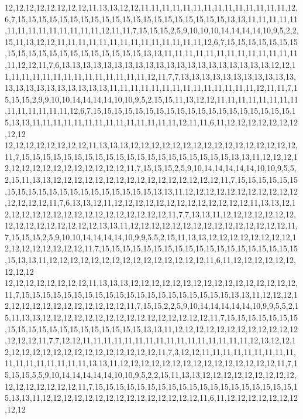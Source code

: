 12,12,12,12,12,12,12,12,11,13,13,12,12,11,11,11,11,11,11,11,11,11,11,11,11,11,11,12,6,7,15,15,15,15,15,15,15,15,15,15,15,15,15,15,15,15,15,15,15,15,13,13,11,11,11,11,11,11,11,11,11,11,11,11,11,11,12,11,11,7,15,15,15,2,5,9,10,10,10,14,14,14,14,10,9,5,2,2,15,11,13,12,12,11,11,11,11,11,11,11,11,11,11,11,11,11,11,12,6,7,15,15,15,15,15,15,15,15,15,15,15,15,15,15,15,15,15,15,15,15,13,13,11,11,11,11,11,11,11,11,11,11,11,11,11,11,12,12,11,7,6,13,13,13,13,13,13,13,13,13,13,13,13,13,13,13,13,13,13,13,13,12,12,11,11,11,11,11,11,11,11,11,11,11,11,11,11,12,11,7,7,13,13,13,13,13,13,13,13,13,13,13,13,13,13,13,13,13,13,13,13,13,11,11,11,11,11,11,11,11,11,11,11,11,11,11,12,11,11,7,15,15,15,2,9,9,10,10,14,14,14,14,10,10,9,5,2,15,15,11,13,12,12,11,11,11,11,11,11,11,11,11,11,11,11,11,11,12,6,7,15,15,15,15,15,15,15,15,15,15,15,15,15,15,15,15,15,15,15,15,13,13,11,11,11,11,11,11,11,11,11,11,11,11,11,11,12,11,11,6,11,12,12,12,12,12,12,12,12,12
12,12,12,12,12,12,12,12,11,13,13,13,12,12,12,12,12,12,12,12,12,12,12,12,12,12,12,12,11,7,15,15,15,15,15,15,15,15,15,15,15,15,15,15,15,15,15,15,15,15,13,13,11,12,12,12,12,12,12,12,12,12,12,12,12,12,12,12,11,7,15,15,15,2,5,9,10,14,14,14,14,14,10,10,9,5,5,2,15,11,13,13,12,12,12,12,12,12,12,12,12,12,12,12,12,12,12,12,11,7,15,15,15,15,15,15,15,15,15,15,15,15,15,15,15,15,15,15,15,15,13,13,11,12,12,12,12,12,12,12,12,12,12,12,12,12,12,12,11,7,6,13,13,12,11,12,12,12,12,12,12,12,12,12,12,12,12,12,11,13,13,12,12,12,12,12,12,12,12,12,12,12,12,12,12,12,12,12,11,7,7,13,13,11,12,12,12,12,12,12,12,12,12,12,12,12,12,12,12,12,13,13,11,12,12,12,12,12,12,12,12,12,12,12,12,12,12,12,11,7,15,15,15,2,5,9,10,10,14,14,14,14,10,9,9,5,5,2,15,11,13,13,12,12,12,12,12,12,12,12,12,12,12,12,12,12,12,12,11,7,15,15,15,15,15,15,15,15,15,15,15,15,15,15,15,15,15,15,15,15,13,13,11,12,12,12,12,12,12,12,12,12,12,12,12,12,12,12,11,6,11,12,12,12,12,12,12,12,12,12
12,12,12,12,12,12,12,12,11,13,13,13,12,12,12,12,12,12,12,12,12,12,12,12,12,12,12,12,11,7,15,15,15,15,15,15,15,15,15,15,15,15,15,15,15,15,15,15,15,15,13,13,11,12,12,12,12,12,12,12,12,12,12,12,12,12,12,12,11,7,15,15,2,2,5,9,10,14,14,14,14,14,10,9,9,5,5,2,15,11,13,13,12,12,12,12,12,12,12,12,12,12,12,12,12,12,12,12,11,7,15,15,15,15,15,15,15,15,15,15,15,15,15,15,15,15,15,15,15,15,13,13,11,12,12,12,12,12,12,12,12,12,12,12,12,12,12,12,11,7,7,12,12,11,11,11,11,11,11,11,11,11,11,11,11,11,11,11,11,12,13,12,12,12,12,12,12,12,12,12,12,12,12,12,12,12,12,12,11,7,3,12,12,11,11,11,11,11,11,11,11,11,11,11,11,11,11,11,11,11,13,13,11,12,12,12,12,12,12,12,12,12,12,12,12,12,12,12,11,7,15,15,15,5,5,9,10,14,14,14,14,14,10,10,9,5,2,2,15,11,13,13,12,12,12,12,12,12,12,12,12,12,12,12,12,12,12,12,11,7,15,15,15,15,15,15,15,15,15,15,15,15,15,15,15,15,15,15,15,15,13,13,11,12,12,12,12,12,12,12,12,12,12,12,12,12,12,12,11,6,11,12,12,12,12,12,12,12,12,12
